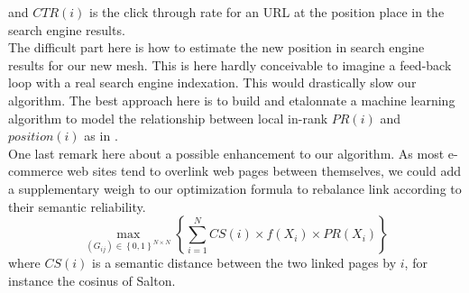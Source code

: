\documentclass{iSWAGArticle}
\begin{document}
  and $CTR\left(i\right)$ is the click through rate for an URL at the position place in the search engine results.
  \\\newline
  The difficult part here is how to estimate the new position in search engine results for our new mesh.
  This is here hardly conceivable to imagine a feed-back loop with a real search engine indexation. This would drastically
  slow our algorithm. The best approach here is to build and etalonnate a machine learning algorithm to model the relationship between local in-rank $PR\left(i\right)$
  and $position(i)$ as in \cite{learning_to_rank}.
  \\\newline
  One last remark here about a possible enhancement to our algorithm. As most e-commerce web sites tend to overlink web pages between themselves, 
  we could add a supplementary weigh to our optimization formula to rebalance link according to their semantic reliability.
  \begin{equation}
  \max_{\left(G_{ij}\right)  \in \left\{0,1\right\}^{N\times N}}\left\{ \sum^{N}_{i=1} CS\left(i\right)\times f\left(X_i\right)\times PR(X_i)\right\}
  \end{equation}
  where $CS(i)$ is a semantic distance between the two linked pages by $i$, for instance the cosinus of Salton. 
\end{document}
